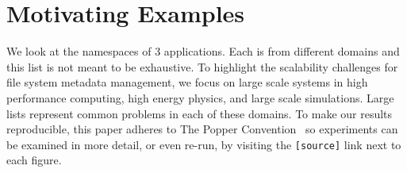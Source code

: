 \vspace{-0.75em}
\section{Motivating Examples}
\label{sec:motivating-examples}
\vspace{-0.75em}

We look at the namespaces of 3 applications.  Each is from different domains
and this list is not meant to be exhaustive.  To highlight the scalability
challenges for file system metadata management, we focus on large scale systems
in high performance computing, high energy physics, and large scale
simulations. Large lists represent common problems in each of these domains.
To make our results reproducible, this paper adheres to The Popper
Convention~\cite{jimenez:ipdpsw17-popper} so experiments can be examined in
more detail, or even re-run, by visiting the \texttt{[source]} link next to
each figure. 

